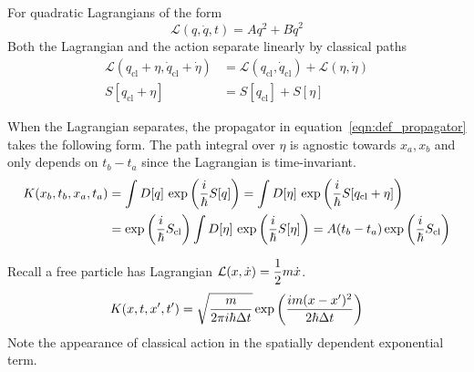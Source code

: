 \begin{theorem}
    For quadratic Lagrangians of the form 
    \[\mathcal L(q, \dot q, t)=Aq^2+B\dot q^2\]
    Both the Lagrangian and the action separate linearly by classical paths 
    \begin{equation}\begin{aligned}
        \mathcal L(q_{\mathrm{cl}} + \eta, \dot q_{\mathrm{cl}} + \dot \eta) &= 
            \mathcal L(q_{\mathrm{cl}}, \dot q_{\mathrm{cl}}) + \mathcal L(\eta, \dot \eta) \\ 
        S[q_{\mathrm{cl}}+\eta] &= S[q_{\mathrm{cl}}] + S[\eta]
    \end{aligned}\end{equation}
\end{theorem}

\begin{theorem}
    When the Lagrangian separates, the propagator in equation~\ref{eqn:def_propagator} takes the following form. 
    The path integral over $\eta$ is agnostic towards $x_a, x_b$ and only depends on $t_b-t_a$ since the Lagrangian 
    is time-invariant. 
    \[\begin{aligned}\label{eqn:separable_propagator}
        K(x_b, t_b, x_a, t_a)&=\int D[q]\, \exp\left(\dfrac i \hbar S[q]\right) 
        =\int D[\eta]\, \exp\left(\dfrac i \hbar S[q_{\mathrm{cl}}+\eta]\right) \\ 
        &= \exp\left(\dfrac i {\hbar} S_{\mathrm{cl}}\right) \int D[\eta]\, \exp\left(\dfrac i \hbar S[\eta]\right)
        =A(t_b-t_a)\exp\left(\dfrac i {\hbar} S_{\mathrm{cl}}\right)
    \end{aligned}\]
\end{theorem}

\begin{example}
    Recall a free particle has Lagrangian $\mathcal L(x, \dot x)=\dfrac 1 2 m \dot x$. 
    \begin{equation}
        K(x, t, x', t') = \sqrt{\dfrac m {2\pi i \hbar \Delta t}}\exp\left(\dfrac{im(x-x')^2}{2\hbar \Delta t}\right)
    \end{equation}
    Note the appearance of classical action in the spatially dependent exponential term. 
\end{example}

